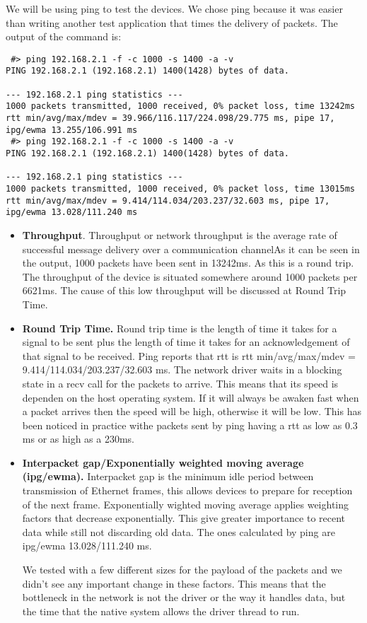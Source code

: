 We will be using ping to test the devices. We chose ping because it was easier than writing another test application
that times the delivery of packets. The output of the command is:
\lstset{language=zsh,caption=,label=lst:pingout}
\begin{lstlisting}
 #> ping 192.168.2.1 -f -c 1000 -s 1400 -a -v
PING 192.168.2.1 (192.168.2.1) 1400(1428) bytes of data.
                 
--- 192.168.2.1 ping statistics ---
1000 packets transmitted, 1000 received, 0% packet loss, time 13242ms
rtt min/avg/max/mdev = 39.966/116.117/224.098/29.775 ms, pipe 17, ipg/ewma 13.255/106.991 ms
 #> ping 192.168.2.1 -f -c 1000 -s 1400 -a -v
PING 192.168.2.1 (192.168.2.1) 1400(1428) bytes of data.
                 
--- 192.168.2.1 ping statistics ---
1000 packets transmitted, 1000 received, 0% packet loss, time 13015ms
rtt min/avg/max/mdev = 9.414/114.034/203.237/32.603 ms, pipe 17, ipg/ewma 13.028/111.240 ms
\end{lstlisting}

\begin{itemize}
  \item \textbf{Throughput}. Throughput or network throughput is the average rate of successful message delivery 
over a communication channelAs it can be seen in the output, 1000 packets have been sent in 13242ms. As this
is a round trip. The throughput of the device is situated somewhere around 1000 packets per 6621ms. The cause of this
low throughput will be discussed at Round Trip Time.
  \item \textbf{Round Trip Time.}  Round trip time is the length of time it takes for a signal to be sent plus the 
length of time it takes for an acknowledgement of that signal to be received. Ping reports that rtt is
rtt min/avg/max/mdev = 9.414/114.034/203.237/32.603 ms. The network driver waits in a blocking state in a recv
call for the packets to arrive. This means that its speed is dependen on the host operating system. If it will
always be awaken fast when a packet arrives then the speed will be high, otherwise it will be low. This has been
noticed in practice withe packets sent by ping having a rtt as low as 0.3 ms or as high as a 230ms.
  \item \textbf{Interpacket gap/Exponentially weighted moving average (ipg/ewma).} Interpacket gap is the minimum idle period
between transmission of Ethernet frames, this allows devices to prepare for reception of the next frame. Exponentially wighted moving
average applies weighting factors that decrease exponentially. This give greater importance to recent data while still not discarding
old data. The ones calculated by ping are ipg/ewma 13.028/111.240 ms.

We tested with a few different sizes for the payload of the packets and we didn't see any important change in these
factors. This means that the bottleneck in the network is not the driver or the way it handles data, but the time
that the native system allows the driver thread to run.

\end{itemize}
